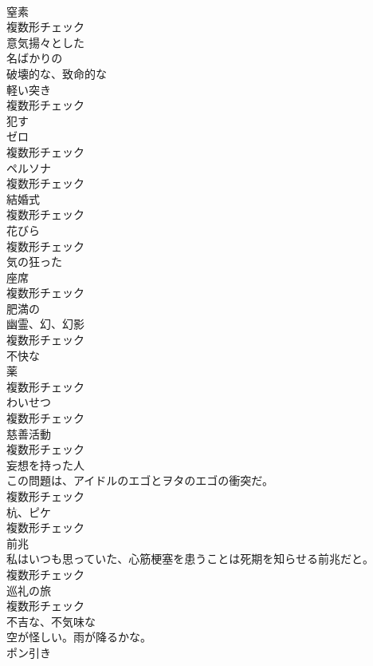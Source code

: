 \documentclass[8pt]{extreport}
\begin{document}
\begin{CJK}{UTF8}{min}
\\	[名詞]	窒素	
\\	複数形チェック
\\	[形容詞]	意気揚々とした	
\\	[形容詞]	名ばかりの	
\\	[形容詞]	破壊的な、致命的な	
\\	[名詞]	軽い突き	
\\	複数形チェック
\\	[動詞]	犯す	
\\	[名詞]	ゼロ	
\\	複数形チェック
\\	[名詞]	ペルソナ	
\\	複数形チェック
\\	[名詞]	結婚式	
\\	複数形チェック
\\	[名詞]	花びら	
\\	複数形チェック
\\	[形容詞]	気の狂った	
\\	[名詞]	座席	
\\	複数形チェック
\\	[形容詞]	肥満の	
\\	[名詞]	幽霊、幻、幻影	
\\	複数形チェック
\\	[形容詞]	不快な	
\\	[名詞]	薬	
\\	複数形チェック
\\	[名詞]	わいせつ	
\\	複数形チェック
\\	[名詞]	慈善活動	
\\	複数形チェック
\\	[名詞]	妄想を持った人	
\\	この問題は、アイドルのエゴとヲタのエゴの衝突だ。	
\\	複数形チェック
\\	[名詞]	杭、ピケ	
\\	複数形チェック
\\	[名詞]	前兆	
\\	私はいつも思っていた、心筋梗塞を患うことは死期を知らせる前兆だと。	
\\	複数形チェック
\\	[名詞]	巡礼の旅	
\\	複数形チェック
\\	[形容詞]	不吉な、不気味な	
\\	空が怪しい。雨が降るかな。	
\\	[名詞]	ポン引き	

\end{CJK}
\end{document}
